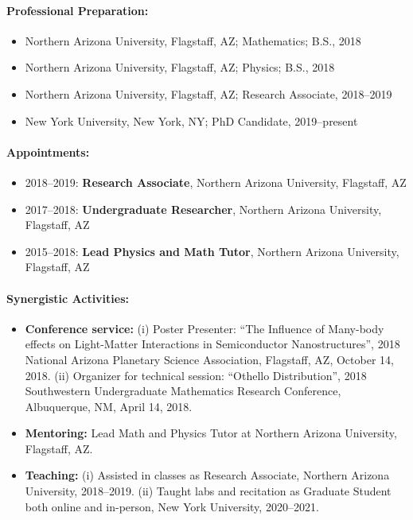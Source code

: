 \documentclass[12pt]{article}
\begin{document}
\paragraph{Professional Preparation:}
\begin{itemize}
    \item Northern Arizona University, Flagstaff, AZ;
        Mathematics;
        B.S., 2018
    \item Northern Arizona University, Flagstaff, AZ;
        Physics;
        B.S., 2018
\item Northern Arizona University, Flagstaff, AZ;
        Research Associate, 2018--2019
    \item New York University, New York, NY;
        PhD Candidate, 2019--present
        \end{itemize}

\paragraph{Appointments:}

\begin{itemize}
    \item 2018--2019:
        \textbf{Research Associate},
        Northern Arizona University,
        Flagstaff, AZ
    \item 2017--2018:
        \textbf{Undergraduate Researcher},
        Northern Arizona University,
        Flagstaff, AZ
    \item 2015--2018:
        \textbf{Lead Physics and Math Tutor},
        Northern Arizona University,
        Flagstaff, AZ
\end{itemize}

\paragraph{Synergistic Activities:}

\begin{itemize}
    \item \textbf{Conference service:}
        (i) Poster Presenter: ``The Influence of Many-body effects on Light-Matter Interactions in Semiconductor Nanostructures'', 2018 National Arizona Planetary Science Association, Flagstaff, AZ,
        October 14, 2018.
        (ii) Organizer for technical session: ``Othello Distribution'', 2018 Southwestern Undergraduate Mathematics Research Conference, Albuquerque, NM,
        April 14, 2018.
    \item \textbf{Mentoring:}
        Lead Math and Physics Tutor at Northern Arizona University,
        Flagstaff, AZ.
    \item \textbf{Teaching:}
        (i) Assisted in classes as Research Associate, Northern Arizona
        University, 2018--2019.
        (ii) Taught labs and recitation as Graduate Student both online and in-person, New York University, 2020--2021.
\end{itemize}
\end{document}

